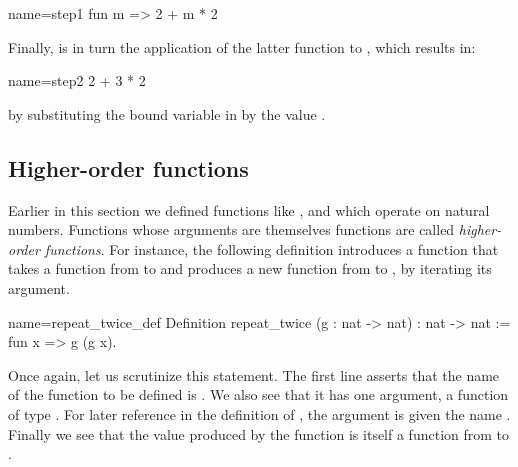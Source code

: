 \begin{coq}{name=step1}{}
fun m => 2 + m * 2
\end{coq}

Finally,  is in turn the application of the latter function to
, which results in:

\begin{coq}{name=step2}{}
2 + 3 * 2
\end{coq}

by substituting the bound variable  in  by
the value .




\subsection{Higher-order functions}

Earlier in this section we defined functions like ,  and 
which operate on natural numbers. Functions whose arguments are
themselves functions are called \emph{higher-order functions}.
For instance, the following definition introduces a function that
takes a function from  to  and produces a new function
from  to , by iterating its argument.

\begin{coq}{name=repeat_twice_def}{}
Definition repeat_twice (g : nat -> nat) : nat -> nat :=
  fun x => g (g x).
\end{coq}

Once again, let us scrutinize this \Coq{} statement. The first line
asserts that the name of the function to be defined is .
We also see that it has one argument, a function of
type .  For later reference in the definition of
, the argument is given the name .  Finally
we see that the value produced by the function 
is itself a function from  to .

